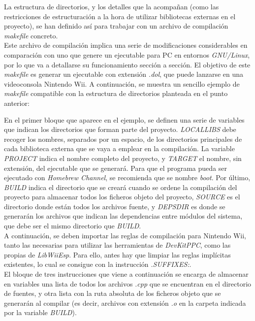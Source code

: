 La estructura de directorios, y los detalles que la acompañan (como las restricciones de estructuración a la hora de utilizar bibliotecas externas en el proyecto), se han definido así para trabajar con un archivo de compilación \emph{makefile} concreto. \\

Este archivo de compilación implica una serie de modificaciones considerables en comparación con uno que genere un ejecutable para PC en entornos \emph{GNU/Linux}, por lo que va a detallarse su funcionamiento sección a sección. El objetivo de este \emph{makefile} es generar un ejecutable con extensión \emph{.dol}, que puede lanzarse en una videoconsola Nintendo Wii. A continuación, se muestra un sencillo ejemplo de \emph{makefile} compatible con la estructura de directorios planteada en el punto anterior:



En el primer bloque que aparece en el ejemplo, se definen una serie de variables que indican los directorios que forman parte del proyecto. \emph{LOCALLIBS} debe recoger los nombres, separados por un espacio, de los directorios principales de cada biblioteca externa que se vaya a emplear en la compilación. La variable \emph{PROJECT} indica el nombre completo del proyecto, y \emph{TARGET} el nombre, sin extensión, del ejecutable que se generará. Para que el programa pueda ser ejecutado con \emph{Homebrew Channel}, se recomienda que se nombre \emph{boot}. Por último, \emph{BUILD} indica el directorio que se creará cuando se ordene la compilación del proyecto para almacenar todos los ficheros objeto del proyecto, \emph{SOURCE} es el directorio donde están todos los archivos fuente, y \emph{DEPSDIR} es donde se generarán los archivos que indican las dependencias entre módulos del sistema, que debe ser el mismo directorio que \emph{BUILD}. \\

A continuación, se deben importar las reglas de compilación para Nintendo Wii, tanto las necesarias para utilizar las herramientas de \emph{DevKitPPC}, como las propias de \emph{LibWiiEsp}. Para ello, antes hay que limpiar las reglas implícitas existentes, lo cual se consigue con la instrucción \emph{.SUFFIXES:}. \\

El bloque de tres instrucciones que viene a continuación se encarga de almacenar en variables una lista de todos los archivos \emph{.cpp} que se encuentran en el directorio de fuentes, y otra lista con la ruta absoluta de los ficheros objeto que se generarán al compilar (es decir, archivos con extensión \emph{.o} en la carpeta indicada por la variable \emph{BUILD}). \\


